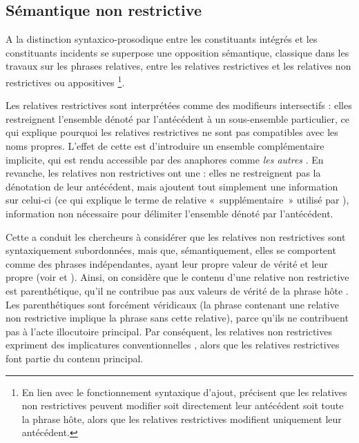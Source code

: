 \subsection{Sémantique non restrictive}\label{ch3:sect3.3.1}

A la distinction syntaxico-prosodique entre les constituants intégrés et les constituants incidents se superpose une opposition sémantique, classique dans les travaux sur les phrases relatives, entre les relatives restrictives et les relatives non restrictives ou appositives \citep{Arnold2004,Arnold2007,ArnoldEtAl2008}\footnote{En lien avec le fonctionnement syntaxique d’ajout, \citet{ArnoldEtAl2008} précisent que les relatives non restrictives peuvent modifier soit directement leur antécédent soit toute la phrase hôte, alors que les relatives restrictives modifient uniquement leur antécédent.}. 

Les relatives restrictives sont interprétées comme des modifieurs intersectifs : elles restreignent l’ensemble dénoté par l’antécédent à un sous-ensemble particulier, ce qui explique pourquoi les relatives restrictives ne sont pas compatibles avec les noms propres. L’effet de cette  est d’introduire un ensemble complémentaire implicite, qui est rendu accessible par des anaphores comme \textit{les autres} \citep{Arnold2004}. En revanche, les relatives non restrictives ont une  : elles ne restreignent pas la dénotation de leur antécédent, mais ajoutent tout simplement une information sur celui-ci (ce qui explique le terme de relative «~supplémentaire~» utilisé par \citealt{HuddlestonEtAl2002}), information non nécessaire pour délimiter l’ensemble dénoté par l’antécédent.

Cette  a conduit les chercheurs à considérer que les relatives non restrictives sont syntaxiquement subordonnées, mais que, sémantiquement, elles se comportent comme des phrases indépendantes, ayant leur propre valeur de vérité et leur propre  (voir \citealt{Peterson2004} et \citealt{Arnold2004}). Ainsi, on considère que le contenu d’une relative non restrictive est parenthétique, {\cad} qu’il ne contribue pas aux valeurs de vérité de la phrase hôte \citep{HuddlestonEtAl2002}. Les parenthétiques sont forcément véridicaux (la phrase contenant une relative non restrictive implique la phrase sans cette relative), parce qu’ils ne contribuent pas à l’acte illocutoire principal. Par conséquent, les relatives non restrictives expriment des implicatures conventionnelles \citep{Potts2005}, alors que les relatives restrictives font partie du contenu principal.

